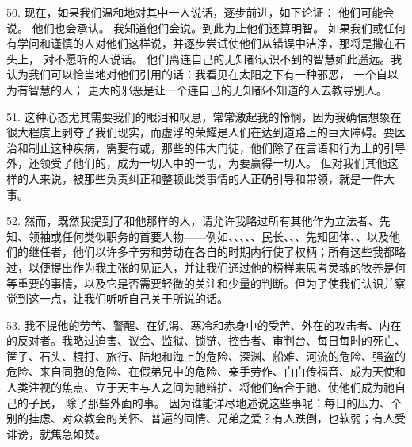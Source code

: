 50. 现在，如果我们温和地对其中一人说话，逐步前进，如下论证：  他们可能会说。 他们也会承认。  我知道他们会说。到此为止他们还算明智。  如果我们或任何有学问和谨慎的人对他们这样说，并逐步尝试使他们从错误中洁净，那将是撒在石头上， 对不愿听的人说话。 他们离连自己的无知都认识不到的智慧如此遥远。我认为我们可以恰当地对他们引用的话：我看见在太阳之下有一种邪恶， 一个自以为有智慧的人； 更大的邪恶是让一个连自己的无知都不知道的人去教导别人。\par

51. 这种心态尤其需要我们的眼泪和叹息，常常激起我的怜悯，因为我确信想象在很大程度上剥夺了我们现实，而虚浮的荣耀是人们在达到道路上的巨大障碍。要医治和制止这种疾病，需要有或，那些的伟大门徒，他们除了在言语和行为上的引导外，还领受了他们的，成为一切人中的一切，为要赢得一切人。 但对我们其他这样的人来说，被那些负责纠正和整顿此类事情的人正确引导和带领，就是一件大事。\par

52. 然而，既然我提到了和他那样的人，请允许我略过所有其他作为立法者、先知、领袖或任何类似职务的首要人物——例如、、、、、民长、、、先知团体、、以及他们的继任者，他们以许多辛劳和劳动在各自的时期内行使了权柄；所有这些我都略过，以便提出作为我主张的见证人，并让我们通过他的榜样来思考灵魂的牧养是何等重要的事情，以及它是否需要轻微的关注和少量的判断。但为了使我们认识并察觉到这一点，让我们听听自己关于所说的话。\par

53. 我不提他的劳苦、警醒、在饥渴、寒冷和赤身中的受苦、外在的攻击者、内在的反对者。我略过迫害、议会、监狱、锁链、控告者、审判台、每日每时的死亡、筐子、石头、棍打、旅行、陆地和海上的危险、深渊、船难、河流的危险、强盗的危险、来自同胞的危险、在假弟兄中的危险、亲手劳作、白白传福音、成为天使和人类注视的焦点、立于天主与人之间为祂辩护、将他们结合于祂、使他们成为祂自己的子民， 除了那些外面的事。 因为谁能详尽地述说这些事呢：每日的压力、个别的挂虑、对众教会的关怀、普遍的同情、兄弟之爱？有人跌倒，也软弱；有人受诽谤，就焦急如焚。\par

